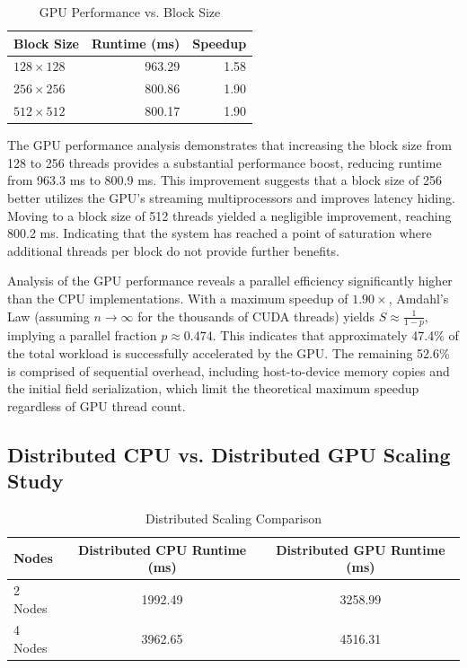 \begin{table}[htbp]
	\centering
	\caption{GPU Performance vs. Block Size}
	\label{tab:gpu_block_size}
	\begin{tabular}{|l|r|r|}
		\hline
		\textbf{Block Size} & \textbf{Runtime (ms)} & \textbf{Speedup} \\ \hline
		$128 \times 128 $   & 963.29                & 1.58             \\ \hline
		$256 \times 256 $   & 800.86                & 1.90             \\ \hline
		$512 \times 512 $   & 800.17                & 1.90             \\ \hline
	\end{tabular}
\end{table}

The GPU performance analysis demonstrates that increasing the block size from 128 to 256 threads provides a substantial performance boost, reducing runtime from 963.3 ms to 800.9 ms.
This improvement suggests that a block size of 256 better utilizes the GPU's streaming multiprocessors and improves latency hiding.
Moving to a block size of 512 threads yielded a negligible improvement, reaching 800.2 ms.
Indicating that the system has reached a point of saturation where additional threads per block do not provide further benefits.

Analysis of the GPU performance reveals a parallel efficiency significantly higher than the CPU implementations. With a maximum speedup of $1.90\times$, Amdahl's Law (assuming $n \to \infty$ for the thousands of CUDA threads) yields $S \approx \frac{1}{1-p}$, implying a parallel fraction $p \approx 0.474$. This indicates that approximately 47.4\% of the total workload is successfully accelerated by the GPU. The remaining 52.6\% is comprised of sequential overhead, including host-to-device memory copies and the initial field serialization, which limit the theoretical maximum speedup regardless of GPU thread count.


\subsection{Distributed CPU vs. Distributed GPU Scaling Study}

\begin{table}[htbp]
	\centering
	\caption{Distributed Scaling Comparison}
	\label{tab:distributed_scaling}
	\begin{tabular}{|l|c|c|}
		\hline
		\textbf{Nodes} & \textbf{Distributed CPU Runtime (ms)} & \textbf{Distributed GPU Runtime (ms)} \\ \hline
		2 Nodes        & 1992.49                               & 3258.99                               \\ \hline
		4 Nodes        & 3962.65                               & 4516.31                               \\ \hline
	\end{tabular}
\end{table}

